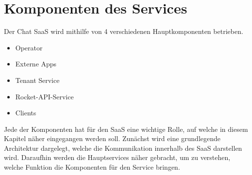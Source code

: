 \chapter{Komponenten des Services}
\label{chap:komponenten}

Der Chat \ac{SaaS} wird mithilfe von 4 verschiedenen Hauptkomponenten betrieben.
\begin{itemize}
  \item Operator
  \item Externe Apps
  \item Tenant Service
  \item Rocket-API-Service
  \item Clients
\end{itemize}

Jede der Komponenten hat für den \ac{SaaS} eine wichtige Rolle, auf welche in diesem Kapitel näher eingegangen werden soll.
Zunächst wird eine grundlegende Architektur dargelegt, welche die Kommunikation innerhalb des \ac{SaaS} darstellen wird.
Daraufhin werden die Hauptservices näher gebracht, um zu verstehen, welche Funktion die Komponenten für den Service bringen.
